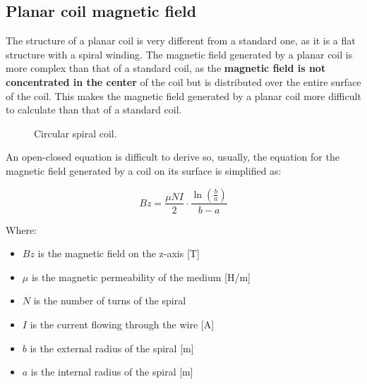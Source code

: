 \subsection{Planar coil magnetic field}
The structure of a planar coil is very different from a standard one, as it is a flat structure with a spiral winding. The magnetic field generated by a planar coil is more complex than that of a standard coil, as the \textbf{magnetic field is not concentrated in the center} of the coil but is distributed over the entire surface of the coil. This makes the magnetic field generated by a planar coil more difficult to calculate than that of a standard coil.

\begin{figure}[H]
    \centering
    
    \caption[Coil spiral]{Circular spiral coil.}
    \label{fig:Coil_spiral}
\end{figure}

\begin{samepage}
    An open-closed equation is difficult to derive so, usually, the equation for the magnetic field generated by a coil on its surface is simplified as:
    \nopagebreak

    \begin{equation}
        Bz = \frac{\mu N I}{2} \cdot \frac{\ln(\frac{b}{a})}{b-a} %
        \label{eq: Spiral_magn_field_eq}
    \end{equation}
    \nopagebreak

    Where:
    \begin{itemize}
        \item $Bz$ is the magnetic field on the z-axis [T]
        \item $\mu$ is the magnetic permeability of the medium [H/m]
        \item $N$ is the number of turns of the spiral
        \item $I$ is the current flowing through the wire [A]
        \item $b$ is the external radius of the spiral [m]
        \item $a$ is the internal radius of the spiral [m]
    \end{itemize}
\end{samepage}

